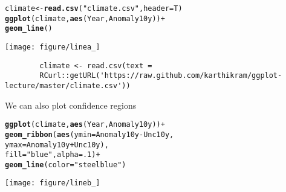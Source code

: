 \documentclass{beamer}\usepackage[]{graphicx}\usepackage[]{color}
\makeatletter
\newcommand{\hlstr}[1]{\textcolor[rgb]{0.192,0.494,0.8}{#1}}%
\newcommand{\hlkwd}[1]{\textcolor[rgb]{0.737,0.353,0.396}{\textbf{#1}}}%
\newenvironment{kframe}{%
 \def\at@end@of@kframe{}%
 \ifinner\ifhmode%
  \def\at@end@of@kframe{\end{minipage}}%
  \begin{minipage}{\columnwidth}%
 \fi\fi%
 \def\FrameCommand##1{\hskip\@totalleftmargin \hskip-\fboxsep
 \colorbox{shadecolor}{##1}\hskip-\fboxsep
     \hskip-\linewidth \hskip-\@totalleftmargin \hskip\columnwidth}%
 \MakeFramed {\advance\hsize-\width
   \@totalleftmargin\z@ \linewidth\hsize
   \@setminipage}}%
 {\par\unskip\endMakeFramed%
 \at@end@of@kframe}
\newenvironment{knitrout}{}{} %
\makeatother
\begin{document}
\begin{frame}[fragile]
\begin{knitrout}\footnotesize
{}\color{fgcolor}\begin{kframe}


{\ttfamily\noindent\bfseries\color{errorcolor}{\#\# Error: cannot change working directory}}\end{kframe}
\end{knitrout}

\begin{knitrout}\footnotesize
{}\color{fgcolor}\begin{kframe}
\begin{alltt}
climate <- \hlkwd{read.csv}(\hlstr{"climate.csv"}, header = T)
\hlkwd{ggplot}(climate, \hlkwd{aes}(Year, Anomaly10y)) +
\hlkwd{geom_line}()
\end{alltt}
\end{kframe}

{\centering \texttt{[image: figure/linea\_]} 

}



\end{knitrout}

\begin{flushright}
\begingroup
    \fontsize{6pt}{12pt}\selectfont
    \begin{verbatim}
        climate <- read.csv(text =
        RCurl::getURL('https://raw.github.com/karthikram/ggplot-lecture/master/climate.csv'))
    \end{verbatim}
\endgroup
\end{flushright}
\end{frame}

\begin{frame}[fragile]
We can also plot confidence regions
\begin{knitrout}\footnotesize
{}\color{fgcolor}\begin{kframe}
\begin{alltt}
\hlkwd{ggplot}(climate, \hlkwd{aes}(Year, Anomaly10y)) +
\hlkwd{geom_ribbon}(\hlkwd{aes}(ymin = Anomaly10y - Unc10y,
ymax = Anomaly10y + Unc10y),
fill = \hlstr{"blue"}, alpha = .1) +
\hlkwd{geom_line}(color = \hlstr{"steelblue"})
\end{alltt}
\end{kframe}

{\centering \texttt{[image: figure/lineb\_]} 

}



\end{knitrout}

\end{frame}
\end{document}
